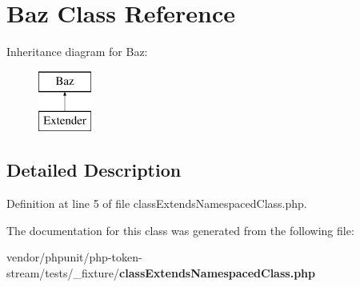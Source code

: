 \section{Baz Class Reference}
\label{class_foo_1_1_bar_1_1_baz}
Inheritance diagram for Baz\+:\begin{figure}[H]
\begin{center}
\leavevmode
\includegraphics[height=2.000000cm]{class_foo_1_1_bar_1_1_baz}
\end{center}
\end{figure}


\subsection{Detailed Description}


Definition at line 5 of file class\+Extends\+Namespaced\+Class.\+php.



The documentation for this class was generated from the following file\+:\begin{DoxyCompactItemize}
\item 
vendor/phpunit/php-\/token-\/stream/tests/\+\_\+fixture/{\bf class\+Extends\+Namespaced\+Class.\+php}\end{DoxyCompactItemize}
